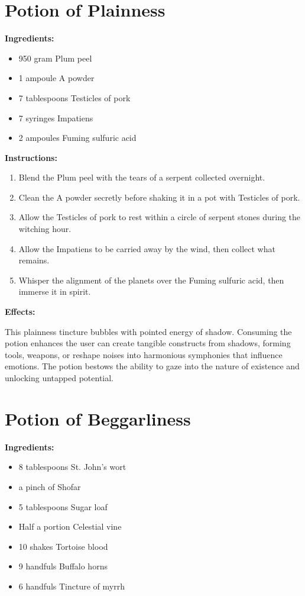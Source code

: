 \documentclass{article}
\begin{document}
\newpage
\section*{Potion of Plainness}

\textbf{Ingredients:}

\begin{itemize}
  \item 950 gram Plum peel
  \item 1 ampoule A powder
  \item 7 tablespoons Testicles of pork
  \item 7 syringes Impatiens
  \item 2 ampoules Fuming sulfuric acid
\end{itemize}

\textbf{Instructions:}

\begin{enumerate}
  \item Blend the Plum peel with the tears of a serpent collected overnight.
  \item Clean the A powder secretly before shaking it in a pot with Testicles of pork.
  \item Allow the Testicles of pork to rest within a circle of serpent stones during the witching hour.
  \item Allow the Impatiens to be carried away by the wind, then collect what remains.
  \item Whisper the alignment of the planets over the Fuming sulfuric acid, then immerse it in spirit.
\end{enumerate}

\textbf{Effects:}

This plainness tincture bubbles with pointed energy of shadow. Consuming the potion enhances the user can create tangible constructs from shadows, forming tools, weapons, or reshape noises into harmonious symphonies that influence emotions. The potion bestows the ability to gaze into the nature of existence and unlocking untapped potential.

\newpage
\section*{Potion of Beggarliness}

\textbf{Ingredients:}

\begin{itemize}
  \item 8 tablespoons St. John's wort
  \item a pinch of Shofar
  \item 5 tablespoons Sugar loaf
  \item Half a portion Celestial vine
  \item 10 shakes Tortoise blood
  \item 9 handfuls Buffalo horns
  \item 6 handfuls Tincture of myrrh
\end{itemize}
\end{document}
